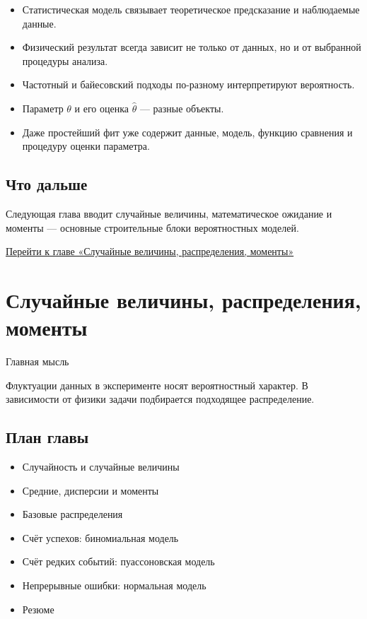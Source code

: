 \documentclass[
  russian,
  letterpaper,
]{scrbook}
\providecommand{\tightlist}{%
  \setlength{\itemsep}{0pt}\setlength{\parskip}{0pt}}
\begin{document}
\begin{itemize}
\tightlist
\item
  Статистическая модель связывает теоретическое предсказание и
  наблюдаемые данные.
\item
  Физический результат всегда зависит не только от данных, но и от
  выбранной процедуры анализа.
\item
  Частотный и байесовский подходы по-разному интерпретируют вероятность.
\item
  Параметр \(\theta\) и его оценка \(\widehat{\theta}\) --- разные
  объекты.
\item
  Даже простейший фит уже содержит данные, модель, функцию сравнения и
  процедуру оценки параметра.
\end{itemize}

\section{Что
дальше}\label{ux447ux442ux43e-ux434ux430ux43bux44cux448ux435}

Следующая глава вводит случайные величины, математическое ожидание и
моменты --- основные строительные блоки вероятностных моделей.

\href{01_random_distributions.qmd}{Перейти к главе «Случайные величины,
распределения, моменты»}

\chapter{Случайные величины, распределения,
моменты}\label{ux441ux43bux443ux447ux430ux439ux43dux44bux435-ux432ux435ux43bux438ux447ux438ux43dux44b-ux440ux430ux441ux43fux440ux435ux434ux435ux43bux435ux43dux438ux44f-ux43cux43eux43cux435ux43dux442ux44b}

Главная мысль

Флуктуации данных в эксперименте носят вероятностный характер. В
зависимости от физики задачи подбирается подходящее распределение.

\section{План
главы}\label{ux43fux43bux430ux43d-ux433ux43bux430ux432ux44b}

\begin{itemize}
\tightlist
\item
  Случайность и случайные величины
\item
  Средние, дисперсии и моменты
\item
  Базовые распределения
\item
  Счёт успехов: биномиальная модель
\item
  Счёт редких событий: пуассоновская модель
\item
  Непрерывные ошибки: нормальная модель
\item
  Резюме
\end{itemize}
\end{document}
